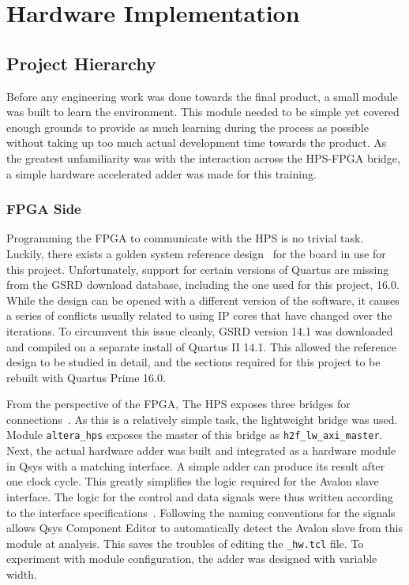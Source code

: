 \section{Hardware Implementation}

\subsection{Project Hierarchy}
Before any engineering work was done towards the final product, a small module
was built to learn the environment.
This module needed to be simple yet covered enough grounds to provide as much
learning during the process as possible without taking up too much actual
development time towards the product.
As the greatest unfamiliarity was with the interaction across the HPS-FPGA
bridge, a simple hardware accelerated adder was made for this training.

\subsubsection{FPGA Side}
Programming the FPGA to communicate with the HPS is no trivial task.
Luckily, there exists a golden system reference design~\cite{Rocket1} for
the board in use for this project.
Unfortunately, support for certain versions of Quartus are missing from
the GSRD download database, including the one used for this project, 16.0.
While the design can be opened with a different version of the software,
it causes a series of conflicts usually related to using IP cores that
have changed over the iterations.
To circumvent this issue cleanly, GSRD version 14.1 was downloaded and compiled
on a separate install of Quartus II 14.1.
This allowed the reference design to be studied in detail, and the sections
required for this project to be rebuilt with Quartus Prime 16.0.

From the perspective of the FPGA, The HPS exposes three bridges for
connections~\cite{Altera6}.
As this is a relatively simple task, the lightweight bridge was used.
Module \texttt{altera\_hps} exposes the master of this bridge as
\texttt{h2f\_lw\_axi\_master}.
Next, the actual hardware adder was built and integrated as a hardware
module in Qsys with a matching interface.
A simple adder can produce its result after one clock cycle.
This greatly simplifies the logic required for the Avalon slave interface.
The logic for the control and data signals were thus written according to the
interface specifications~\cite{Intel3}.
Following the naming conventions for the signals allows Qsys Component Editor
to automatically detect the Avalon slave from this module at analysis.
This saves the troubles of editing the \texttt{\_hw.tcl} file.
To experiment with module configuration, the adder was designed with variable
width.

